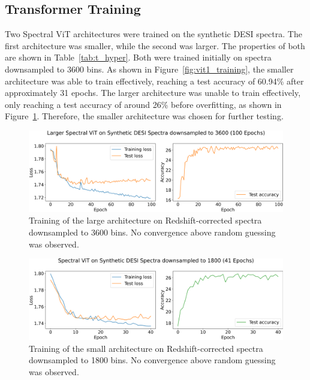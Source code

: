 \subsection{Transformer Training}
\label{sec:transformer_training}
Two Spectral ViT architectures were trained on the synthetic DESI spectra.
The first architecture was smaller, while the second was larger. The properties 
of both are shown in Table~\ref{tab:t_hyper}. 
%     
Both were trained initially on spectra downsampled to 3600 bins. As shown in Figure~\ref{fig:vit1_training}, 
the smaller architecture was able to train effectively, reaching a test accuracy of 60.94\% after approximately 31 
epochs. The larger architecture was unable to train effectively, only reaching a test accuracy of around 26\% before 
overfitting, as shown in Figure~\ref{fig:vit1_big_training}. Therefore, the smaller architecture was chosen for further testing.


\begin{figure}[t]
    \centering
    \includegraphics[width=.8\linewidth]{figures/v1_real/vit_model_V1_bigtraining_new.png}
    \caption[Training of Spectral ViT: V1 Big]{Training of the large architecture on Redshift-corrected spectra downsampled to 3600 bins. No convergence above random guessing was observed. }
    \label{fig:vit1_big_training}
\end{figure}


\begin{figure}[hb]
    \centering
    \includegraphics[width=.8\linewidth]{figures/vit_model_V1.2training_new.png}
    \caption[Training of Spectral ViT: V1.2]{Training of the small architecture on Redshift-corrected spectra downsampled to 1800 bins. No convergence above random guessing was observed. }
    \label{fig:vit1.2_training}
\end{figure}

